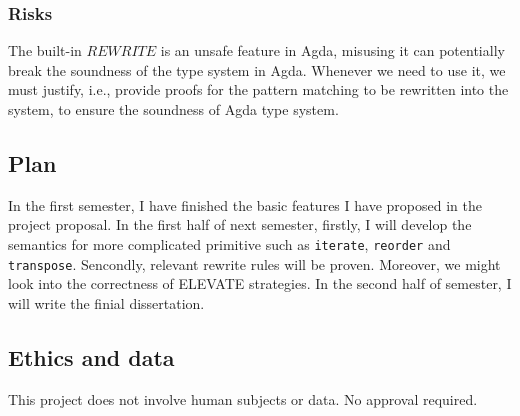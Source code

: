 \documentclass[11pt]{article}
\begin{document}
\subsubsection{Risks}\label{risks}
The built-in $REWRITE$ is an unsafe feature in Agda, misusing it can potentially break the soundness of 
the type system in Agda. Whenever we need to use it, we must justify, i.e., provide proofs for the pattern 
matching to be rewritten into the system, to ensure the soundness of Agda type system.

\subsection{Plan}\label{plan}
In the first semester, I have finished the basic features I have proposed in the project proposal. In the first half of 
next semester, firstly, I will develop the semantics for more complicated primitive such as \texttt{iterate}, 
\texttt{reorder} and \texttt{transpose}. Sencondly, relevant rewrite rules will be proven. Moreover, we might 
look into the correctness of ELEVATE strategies. In the second half of semester, I will write the finial 
dissertation.

    
\subsection{Ethics and data}\label{ethics}
This project does not involve human subjects or data. No approval required.
\end{document}
